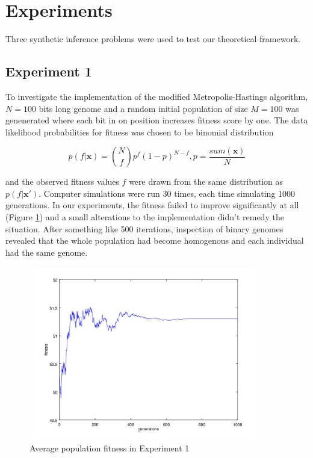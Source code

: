 \documentclass{article}
\begin{document}
\section{Experiments} \label{experiments}

Three synthetic inference problems were used to test our theoretical framework.

\subsection{Experiment 1}

To investigate the implementation of the modified Metropolis-Hastings algorithm, $N=100$ bits long genome and a random initial population of size $M=100$ was genenerated where each bit in on position increases fitness score by one. The data likelihood probabilities for fitness was chosen to be binomial distribution 

\begin{equation}
  p(f|\mathbf{x}) = \binom{N}{f} p^{f}(1-p)^{N-f}, p = \frac{sum(\mathbf{x})}{N}
\end{equation}

and the observed fitness values $f$ were drawn from the same distribution as $p(f|\mathbf{x}')$. Computer simulations were run 30 times, each time simulating 1000 generations. In our experiments, the fitness failed to improve significantly at all (Figure \ref{fig:experiment1f3}) and a small alterations to the implementation didn't remedy the situation. After something like 500 iterations, inspection of binary genomes revealed that the whole population had become homogenous and each individual had the same genome.

\begin{figure}

\centering
\includegraphics[keepaspectratio,width=0.9\textwidth]{experiment1figure3.jpg}

\caption{Average population fitness in Experiment 1}

\label{fig:experiment1f3}

\end{figure}
\end{document}
